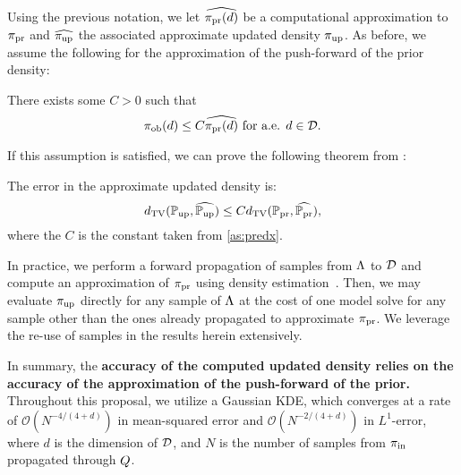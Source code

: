 

Using the previous notation, we let $\widehat{\operatorname*{\pi_{pr}}(d)}$ be a computational approximation to $\operatorname*{\pi_{pr}}$ and $\widehat{\operatorname*{\pi_{up}}}$ the associated approximate updated density $\operatorname*{\pi_{up}}$.
As before, we assume the following for the approximation of the push-forward of the prior density:
\begin{assumption}\label{as:predx}
There exists some $C>0$ such that
\[
\operatorname*{\pi_{ob}} (d) \leq C \widehat{\operatorname*{\pi_{pr}}(d)} \text{ for a.e. } d\in \mathcal{D}.
\]
\end{assumption}

If this assumption is satisfied, we can prove the following theorem from \cite{BJW18}:
\begin{thm}
The error in the approximate updated density is:
\begin{equation}\label{eq:predicted_bound}
d_{\text{TV}} (\operatorname*{\mathbb{P}_{up}}, \widehat{\operatorname*{\mathbb{P}_{up}}}) \leq C d_{\text{TV}} (\operatorname*{\mathbb{P}_{pr}}, \widehat{\operatorname*{\mathbb{P}_{pr}}}),
\end{equation}
where the $C$ is the constant taken from \eqref{as:predx}. 
\end{thm}

In practice, we perform a forward propagation of samples from ${\Lambda}$ to $\mathcal{D}$ and compute an approximation of $\operatorname*{\pi_{pr}}$ using density estimation~\cite{BJW18}.
Then, we may evaluate $\operatorname*{\pi_{up}}$ directly for any sample of ${\Lambda}$ at the cost of one model solve for any sample other than the ones already propagated to approximate $\operatorname*{\pi_{pr}}$. 
We leverage the re-use of samples in the results herein extensively.

In summary, the \textbf{accuracy of the computed updated density relies on the accuracy of the approximation of the push-forward of the prior.}
Throughout this proposal, we utilize a Gaussian KDE, which converges at a rate of $\mathcal{O}(N^{-4/(4+d)})$ in mean-squared error and $\mathcal{O}(N^{-2/(4+d)})$ in $L^1$-error, where $d$ is the dimension of $\mathcal{D}$, and $N$ is the number of samples from $\operatorname*{\pi_{in}}$ propagated through $Q$.

